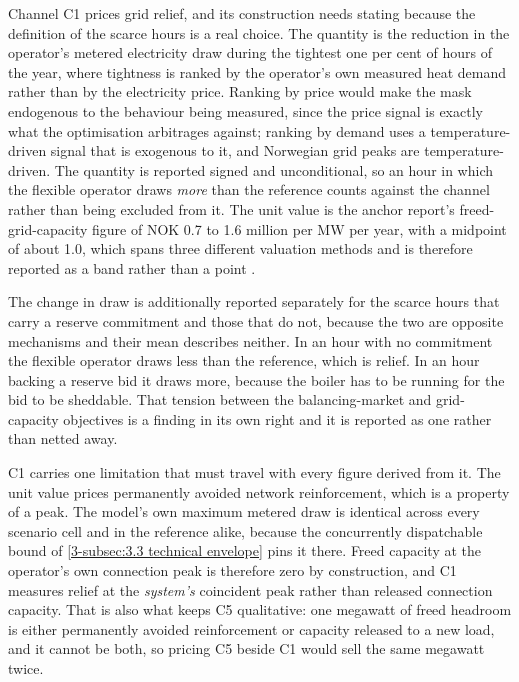 Channel C1 prices grid relief, and its construction needs stating because the definition of the scarce hours is a real choice. The quantity is the reduction in the operator's metered electricity draw during the tightest one per cent of hours of the year, where tightness is ranked by the operator's own measured heat demand rather than by the electricity price. Ranking by price would make the mask endogenous to the behaviour being measured, since the price signal is exactly what the optimisation arbitrages against; ranking by demand uses a temperature-driven signal that is exogenous to it, and Norwegian grid peaks are temperature-driven. The quantity is reported signed and unconditional, so an hour in which the flexible operator draws \emph{more} than the reference counts against the channel rather than being excluded from it. The unit value is the anchor report's freed-grid-capacity figure of NOK 0.7 to 1.6 million per MW per year, with a midpoint of about 1.0, which spans three different valuation methods and is therefore reported as a band rather than a point \cite{Thema_fjernvarme_2024}.

The change in draw is additionally reported separately for the scarce hours that carry a reserve commitment and those that do not, because the two are opposite mechanisms and their mean describes neither. In an hour with no commitment the flexible operator draws less than the reference, which is relief. In an hour backing a reserve bid it draws more, because the boiler has to be running for the bid to be sheddable. That tension between the balancing-market and grid-capacity objectives is a finding in its own right and it is reported as one rather than netted away.

C1 carries one limitation that must travel with every figure derived from it. The unit value prices permanently avoided network reinforcement, which is a property of a peak. The model's own maximum metered draw is identical across every scenario cell and in the reference alike, because the concurrently dispatchable bound of \autoref{3-subsec:3.3 technical envelope} pins it there. Freed capacity at the operator's own connection peak is therefore zero by construction, and C1 measures relief at the \emph{system's} coincident peak rather than released connection capacity. That is also what keeps C5 qualitative: one megawatt of freed headroom is either permanently avoided reinforcement or capacity released to a new load, and it cannot be both, so pricing C5 beside C1 would sell the same megawatt twice.

